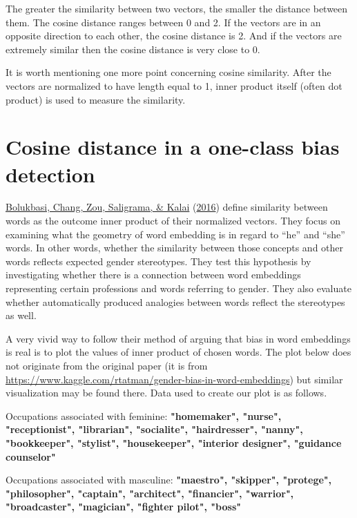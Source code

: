 \documentclass[
  12pt,
]{book}
\begin{document}
The greater the similarity between two vectors, the smaller the distance between them. The cosine distance ranges between 0 and 2. If the vectors are in an opposite direction to each other, the cosine distance is 2. And if the vectors are extremely similar then the cosine distance is very close to 0.

It is worth mentioning one more point concerning cosine similarity. After the vectors are normalized to have length equal to 1, inner product itself (often dot product) is used to measure the similarity.

\hypertarget{cosine-distance-in-a-one-class-bias-detection}{%
\section{Cosine distance in a one-class bias detection}\label{cosine-distance-in-a-one-class-bias-detection}}

\protect\hyperlink{ref-Bolukbasi2016Man}{Bolukbasi, Chang, Zou, Saligrama, \& Kalai} (\protect\hyperlink{ref-Bolukbasi2016Man}{2016})
define similarity between words as the outcome inner product of their normalized vectors.
They focus on examining what the geometry of word embedding is in regard to ``he'' and ``she'' words. In other words, whether the similarity between those concepts and other words reflects expected gender stereotypes. They test this hypothesis by investigating whether there is a connection between word embeddings representing certain professions and words referring to gender. They also evaluate whether automatically produced analogies between words reflect the stereotypes as well.

A very vivid way to follow their method of arguing that bias in word embeddings is real is to plot the values of inner product of chosen words. The plot below does not originate from the original paper (it is from \url{https://www.kaggle.com/rtatman/gender-bias-in-word-embeddings}) but similar visualization may be found there. Data used to create our plot is as follows.
\newline

Occupations associated with feminine: \textbf{"homemaker", "nurse", "receptionist", "librarian", "socialite", "hairdresser", "nanny", "bookkeeper", "stylist", "housekeeper", "interior designer", "guidance counselor"}
\newline

Occupations associated with masculine: \textbf{"maestro", "skipper", "protege", "philosopher", "captain", "architect", "financier", "warrior", "broadcaster", "magician", "fighter pilot", "boss"}
\newline
\end{document}
